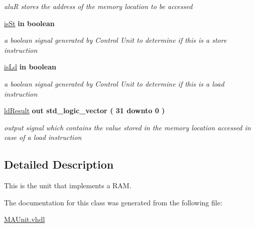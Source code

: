 \begin{DoxyCompactItemize}
\begin{DoxyCompactList}\small\item\em alu\-R stores the address of the memory location to be accessed \end{DoxyCompactList}\item 
\hypertarget{class_m_a_unit_ada232e9bb13e48ba67c49897a8f2a98c}{\hyperlink{class_m_a_unit_ada232e9bb13e48ba67c49897a8f2a98c}{is\-St}  {\bfseries {\bfseries \textcolor{vhdlkeyword}{in}\textcolor{vhdlchar}{ }}} {\bfseries \textcolor{comment}{boolean}\textcolor{vhdlchar}{ }} }\label{class_m_a_unit_ada232e9bb13e48ba67c49897a8f2a98c}

\begin{DoxyCompactList}\small\item\em a boolean signal generated by Control Unit to determine if this is a store instruction \end{DoxyCompactList}\item 
\hypertarget{class_m_a_unit_a4f328a19e16850a109722d3bf847ea76}{\hyperlink{class_m_a_unit_a4f328a19e16850a109722d3bf847ea76}{is\-Ld}  {\bfseries {\bfseries \textcolor{vhdlkeyword}{in}\textcolor{vhdlchar}{ }}} {\bfseries \textcolor{comment}{boolean}\textcolor{vhdlchar}{ }} }\label{class_m_a_unit_a4f328a19e16850a109722d3bf847ea76}

\begin{DoxyCompactList}\small\item\em a boolean signal generated by Control Unit to determine if this is a load instruction \end{DoxyCompactList}\item 
\hypertarget{class_m_a_unit_ac062d1d1a95ee963e9211cbe1c9f7574}{\hyperlink{class_m_a_unit_ac062d1d1a95ee963e9211cbe1c9f7574}{ld\-Result}  {\bfseries {\bfseries \textcolor{vhdlkeyword}{out}\textcolor{vhdlchar}{ }}} {\bfseries \textcolor{comment}{std\-\_\-logic\-\_\-vector}\textcolor{vhdlchar}{ }\textcolor{vhdlchar}{(}\textcolor{vhdlchar}{ } \textcolor{vhdldigit}{31} \textcolor{vhdlchar}{ }\textcolor{vhdlchar}{ }\textcolor{vhdlchar}{ }\textcolor{vhdlkeyword}{downto}\textcolor{vhdlchar}{ }\textcolor{vhdlchar}{ }\textcolor{vhdlchar}{ } \textcolor{vhdldigit}{0} \textcolor{vhdlchar}{ }\textcolor{vhdlchar}{)}\textcolor{vhdlchar}{ }} }\label{class_m_a_unit_ac062d1d1a95ee963e9211cbe1c9f7574}

\begin{DoxyCompactList}\small\item\em output signal which contains the value stored in the memory location accessed in case of a load instruction \end{DoxyCompactList}\end{DoxyCompactItemize}


\subsection{Detailed Description}
This is the unit that implements a R\-A\-M. 

The documentation for this class was generated from the following file\-:\begin{DoxyCompactItemize}
\item 
\hyperlink{_m_a_unit_8vhdl}{M\-A\-Unit.\-vhdl}\end{DoxyCompactItemize}
